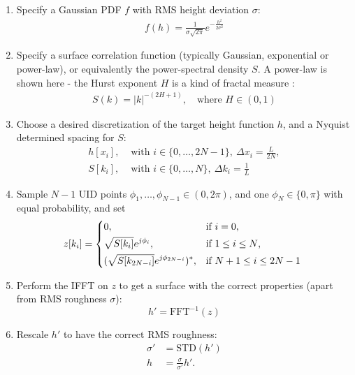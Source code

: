 \documentclass[lettersize,journal]{IEEEtran}
\DeclareRobustCommand{\ifft}[1]{\text{FFT}^{-1}(#1)}
\begin{document}
\begin{enumerate}
   \item Specify a Gaussian PDF $f$ with RMS height deviation $\sigma$:
      \begin{subequations}
      \begin{align*} 
         f(h) = \frac{1}{\sigma \sqrt{2 \pi}} e^{-\frac{h^2}{2
            \sigma^2}}
      \end{align*}
      \end{subequations}
   \item Specify a surface correlation function (typically Gaussian, exponential or
      power-law), or equivalently the power-spectral density $S$. A power-law is
      shown here - the Hurst exponent $H$ is a kind of fractal measure :
      \begin{subequations}
      \begin{align*}
         S(k) = |k|^{-(2H+1)}, \quad \text{where } H \in (0,1)
      \end{align*}
      \end{subequations}
   \item Choose a desired discretization of the target height function $h$, and a
      Nyquist determined spacing for $S$:
      \begin{subequations}
      \begin{align*}
         h[x_i], & \text{ with } i \in \{0, \ldots, 2N-1\}, \ \Delta x_i =
            \frac{L}{2N}, \\
         S[k_i], & \text{ with } i \in \{0, \ldots, N\}, \ \Delta k_i =
            \frac{1}{L}
      \end{align*}
      \end{subequations}
   \item Sample $N-1$ UID points $\phi_1, \ldots, \phi_{N-1} \in (0, 2 \pi)$, and one
      $\phi_N \in \{0, \pi\}$ with equal probability, and set
      {
         \small
      \begin{equation*}
         z[k_i] = 
         \begin{dcases*}
            0, & if $i = 0$, \\ 
            \sqrt{S[k_i]} e^{j \phi_i}, & if $1 \leq i \leq N$, \\
            (\sqrt{S[k_{2N-i}]} e^{j \phi_{2N-i}})^*, & if $N+1 \leq i \leq 2N-1$
         \end{dcases*}
         \label{eq:fftSurface}
      \end{equation*}
      }
   \item Perform the IFFT on $z$ to get a surface with the correct properties (apart
      from RMS roughness $\sigma$):
      \begin{equation*}
         h' = \ifft{z}
      \end{equation*}
   \item Rescale $h'$ to have the correct RMS roughness:
      \begin{subequations}
      \begin{align*}
         \sigma' &= \text{STD}(h') \\
         h &= \frac{\sigma}{\sigma'} h'.
      \end{align*}
      \end{subequations}
\end{enumerate}
\end{document}
